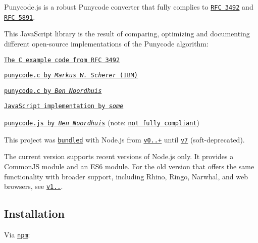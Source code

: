 Punycode.\+js is a robust Punycode converter that fully complies to \href{https://tools.ietf.org/html/rfc3492}{\tt R\+FC 3492} and \href{https://tools.ietf.org/html/rfc5891}{\tt R\+FC 5891}.

This Java\+Script library is the result of comparing, optimizing and documenting different open-\/source implementations of the Punycode algorithm\+:


\begin{DoxyItemize}
\item \href{https://tools.ietf.org/html/rfc3492#appendix-C}{\tt The C example code from R\+FC 3492}
\item \href{http://opensource.apple.com/source/ICU/ICU-400.42/icuSources/common/punycode.c}{\tt {\ttfamily punycode.\+c} by {\itshape Markus W. Scherer} (I\+BM)}
\item \href{https://github.com/bnoordhuis/punycode/blob/master/punycode.c}{\tt {\ttfamily punycode.\+c} by {\itshape Ben Noordhuis}}
\item \href{http://stackoverflow.com/questions/183485/can-anyone-recommend-a-good-free-javascript-for-punycode-to-unicode-conversion/301287#301287}{\tt Java\+Script implementation by {\itshape some}}
\item \href{https://github.com/joyent/node/blob/426298c8c1c0d5b5224ac3658c41e7c2a3fe9377/lib/punycode.js}{\tt {\ttfamily punycode.\+js} by {\itshape Ben Noordhuis}} (note\+: \href{https://github.com/joyent/node/issues/2072}{\tt not fully compliant})
\end{DoxyItemize}

This project was \href{https://github.com/joyent/node/blob/master/lib/punycode.js}{\tt bundled} with Node.\+js from \href{https://github.com/joyent/node/compare/975f1930b1...61e796decc}{\tt v0..+} until \href{https://github.com/nodejs/node/pull/7941}{\tt v7} (soft-\/deprecated).

The current version supports recent versions of Node.\+js only. It provides a Common\+JS module and an E\+S6 module. For the old version that offers the same functionality with broader support, including Rhino, Ringo, Narwhal, and web browsers, see \href{https://github.com/bestiejs/punycode.js/releases/tag/v1.4.1}{\tt v1..}.

\subsection*{Installation}

Via \href{https://www.npmjs.com/}{\tt npm}\+:


